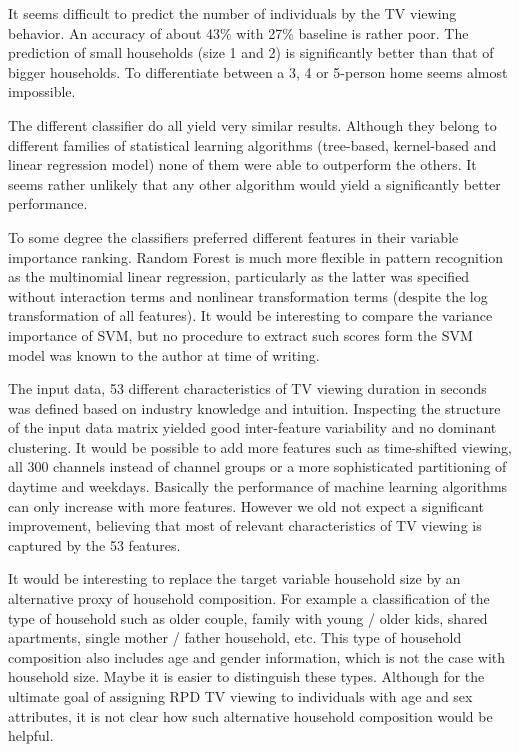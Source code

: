 \documentclass[]{article}
\begin{document}
It seems difficult to predict the number of individuals by the TV
viewing behavior. An accuracy of about 43\% with 27\% baseline is rather
poor. The prediction of small households (size 1 and 2) is significantly
better than that of bigger households. To differentiate between a 3, 4
or 5-person home seems almost impossible.

The different classifier do all yield very similar results. Although
they belong to different families of statistical learning algorithms
(tree-based, kernel-based and linear regression model) none of them were
able to outperform the others. It seems rather unlikely that any other
algorithm would yield a significantly better performance.

To some degree the classifiers preferred different features in their
variable importance ranking. Random Forest is much more flexible in
pattern recognition as the multinomial linear regression, particularly
as the latter was specified without interaction terms and nonlinear
transformation terms (despite the log transformation of all features).
It would be interesting to compare the variance importance of SVM, but
no procedure to extract such scores form the SVM model was known to the
author at time of writing.

The input data, 53 different characteristics of TV viewing duration in
seconds was defined based on industry knowledge and intuition.
Inspecting the structure of the input data matrix yielded good
inter-feature variability and no dominant clustering. It would be
possible to add more features such as time-shifted viewing, all 300
channels instead of channel groups or a more sophisticated partitioning
of daytime and weekdays. Basically the performance of machine learning
algorithms can only increase with more features. However we old not
expect a significant improvement, believing that most of relevant
characteristics of TV viewing is captured by the 53 features.

It would be interesting to replace the target variable household size by
an alternative proxy of household composition. For example a
classification of the type of household such as older couple, family
with young / older kids, shared apartments, single mother / father
household, etc. This type of household composition also includes age and
gender information, which is not the case with household size. Maybe it
is easier to distinguish these types. Although for the ultimate goal of
assigning RPD TV viewing to individuals with age and sex attributes, it
is not clear how such alternative household composition would be
helpful.
\end{document}
